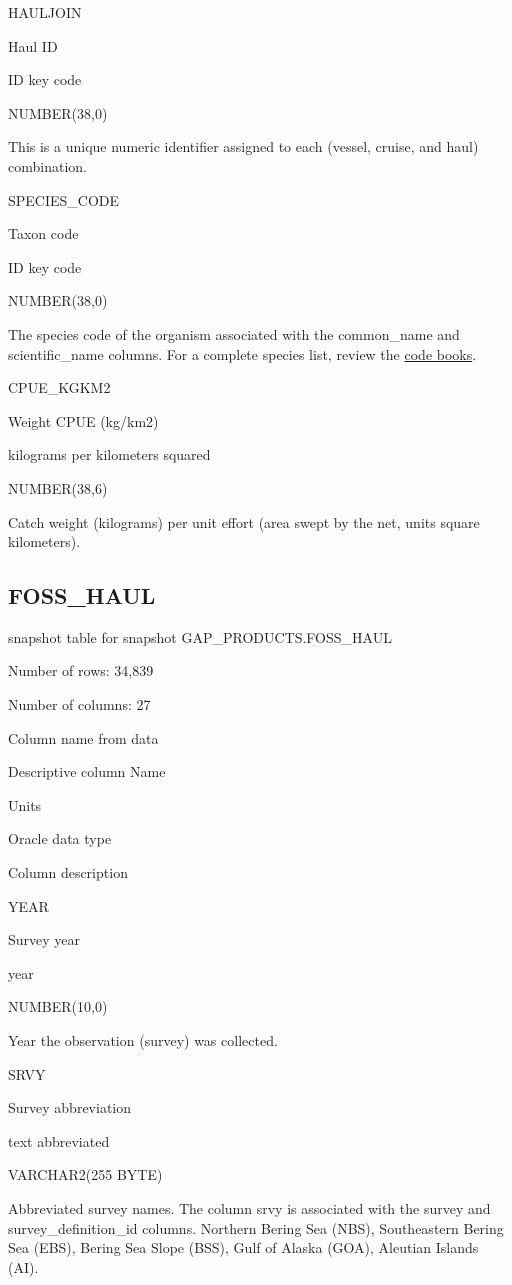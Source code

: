 \documentclass[
  letterpaper,
  oneside,
  open=any]{scrbook}
\begin{document}
HAULJOIN

Haul ID

ID key code

NUMBER(38,0)

This is a unique numeric identifier assigned to each (vessel, cruise,
and haul) combination.

SPECIES\_CODE

Taxon code

ID key code

NUMBER(38,0)

The species code of the organism associated with the common\_name and
scientific\_name columns. For a complete species list, review the
\href{https://www.fisheries.noaa.gov/resource/document/groundfish-survey-species-code-manual-and-data-codes-manual}{code
books}.

CPUE\_KGKM2

Weight CPUE (kg/km2)

kilograms per kilometers squared

NUMBER(38,6)

Catch weight (kilograms) per unit effort (area swept by the net, units
square kilometers).

\subsection{FOSS\_HAUL}\label{foss_haul}

snapshot table for snapshot GAP\_PRODUCTS.FOSS\_HAUL

Number of rows: 34,839

Number of columns: 27

Column name from data

Descriptive column Name

Units

Oracle data type

Column description

YEAR

Survey year

year

NUMBER(10,0)

Year the observation (survey) was collected.

SRVY

Survey abbreviation

text abbreviated

VARCHAR2(255 BYTE)

Abbreviated survey names. The column srvy is associated with the survey
and survey\_definition\_id columns. Northern Bering Sea (NBS),
Southeastern Bering Sea (EBS), Bering Sea Slope (BSS), Gulf of Alaska
(GOA), Aleutian Islands (AI).
\end{document}
